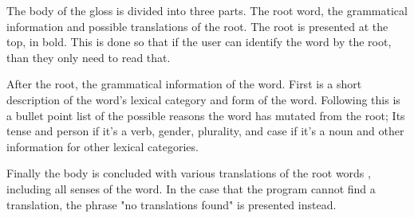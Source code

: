 The body of the gloss is divided into three parts. The root word, the grammatical information and possible translations of the root. The root is presented at the top, in bold. This is done so that if the user can identify the word by the root, than they only need to read that. 

After the root, the grammatical information of the word. First is a short description of the word's lexical category and form of the word. Following this is a bullet point list of the possible reasons the word has mutated from the root; Its tense and person if it's a verb, gender, plurality, and case if it's a noun and other information for other lexical categories. 

Finally the body is concluded with various translations of the root words \autocite{gettys2001}, including all senses of the word. In the case that the program cannot find a translation, the phrase "no translations found" is presented instead. 
 
